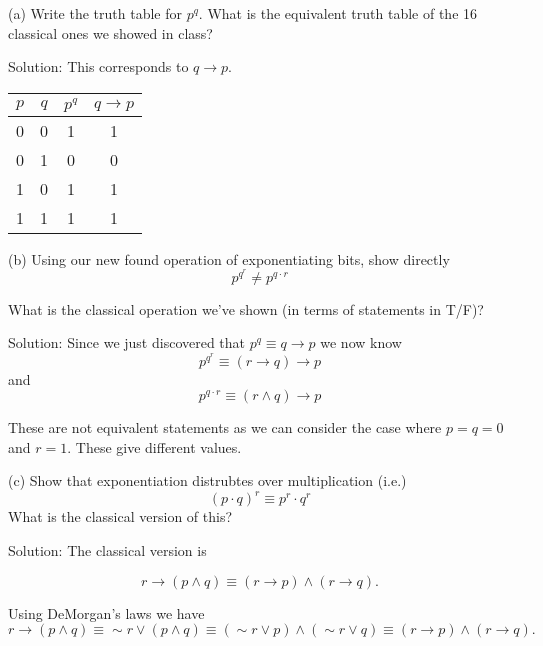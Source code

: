 \documentclass[16 pt]{amsart}
\theoremstyle{definition}
\theoremstyle{remark}
\numberwithin{equation}{subsection}
\begin{document}
\vspace{.25in}

(a) Write the truth table for $p^q$.  What is the equivalent truth table of the 16 classical ones we showed in class?

\vspace{.5in}

Solution:  This corresponds to $q\rightarrow p$.


\begin{center}
\begin{tabular}{c | c | c | c }
$p$ & $q$ & $p^q$ & $q\rightarrow p$\\ 
\hline
0 & 0 & 1 & 1 \\
0 & 1 & 0 & 0 \\
1 & 0 & 1 & 1 \\
1 & 1 & 1 & 1 
\end{tabular}
\end{center}



\vspace{.25in}

(b) Using our new found operation of exponentiating bits, show directly
\[
p^{q^r} \neq p^{q\cdot r}
\]

What is the classical operation we've shown (in terms of statements in T/F)?


\vspace{.5in}

Solution: Since we just discovered that $p^q \equiv q\rightarrow p$  we now know
\[
p^{q^r} \equiv (r\rightarrow q) \rightarrow p
\]
and 
\[
p^{q\cdot r} \equiv (r\wedge q) \rightarrow p
\]

These are not equivalent statements as we can consider the case where $p=q=0$ and $r=1$.  These give different values.

\vspace{.25in}

(c) Show that exponentiation distrubtes over multiplication (i.e.)
\[
(p\cdot q)^r \equiv p^r \cdot q^r
\]
What is the classical version of this?


\vspace{.5in}

Solution: The classical version is

\[
r \rightarrow (p\wedge q) \equiv (r\rightarrow p)\wedge (r\rightarrow q).
\]

Using DeMorgan's laws we have
\[
r\rightarrow(p\wedge q) \equiv \sim r \vee (p\wedge q) \equiv (\sim r \vee p) \wedge (\sim r \vee q) \equiv (r\rightarrow p)\wedge (r\rightarrow q).
\]
\end{document}
